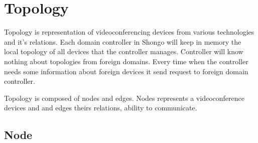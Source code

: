 \documentclass[a4paper]{report}
\begin{document}
\chapter{Topology}

Topology is representation of videoconferencing devices from various technologies and it's relations. Each domain controller in Shongo will keep in memory the local topology of all devices that the controller manages.
Controller will know nothing about topologies from foreign domains. Every time when the controller needs some information about foreign devices it send request to foreign domain controller.

Topology is composed of nodes and edges. Nodes represents a videoconference devices and and edges theirs relations, ability to communicate.

\section{Node}
\end{document}
